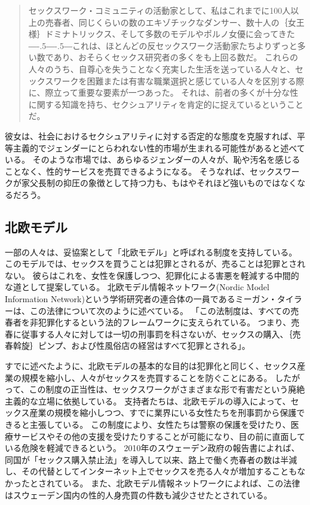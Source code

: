 \documentclass[paper=a4,book,openany]{jlreq}
\def\DDASH{―\kern-.5\zw―\kern-.5\zw―} %
\begin{document}
\begin{quote}
セックスワーク・コミュニティの活動家として、私はこれまでに100人以上の売春者、同じくらいの数のエキゾチックなダンサー、数十人の｛女王様｝{ドミナトリックス}、そして多数のモデルやポルノ女優に会ってきた{\DDASH}これは、ほとんどの反セックスワーク活動家たちよりずっと多い数であり、おそらくセックス研究者の多くをも上回る数だ。
これらの人々のうち、自尊心を失うことなく充実した生活を送っている人々と、セックスワークを困難または有害な職業選択と感じている人々を区別する際に、際立って重要な要素が一つあった。
それは、前者の多くが十分な性に関する知識を持ち、セクシュアリティを肯定的に捉えているということだ。
\citep[pp.128--129]{queen97:_sex_radic_polit_sex_posit}
\end{quote}

彼女は、社会におけるセクシュアリティに対する否定的な態度を克服すれば、平等主義的でジェンダーにとらわれない性的市場が生まれる可能性があると述べている。
そのような市場では、あらゆるジェンダーの人々が、恥や汚名を感じることなく、性的サービスを売買できるようになる。
そうなれば、セックスワークが家父長制の抑圧の象徴として持つ力も、もはやそれほど強いものではなくなるだろう。

\subsection{北欧モデル}

一部の人々は、妥協案として「北欧モデル」と呼ばれる制度を支持している。
このモデルでは、セックスを買うことは犯罪とされるが、売ることは犯罪とされない。
彼らはこれを、女性を保護しつつ、犯罪化による害悪を軽減する中間的な道として提案している。
北欧モデル情報ネットワーク(Nordic Model Information Network)という学術研究者の連合体の一員であるミーガン・タイラーは、この法律について次のように述べている。
「この法制度は、すべての売春者を非犯罪化するという法的フレームワークに支えられている。
つまり、売春に従事する人々に対しては一切の刑事罰を科さないが、セックスの購入、｛売春斡旋｝{ピンプ}、および性風俗店の経営はすべて犯罪とされる」\citep{woodward16:_calls_austr_adopt_nordic_model_prost}。

すでに述べたように、北欧モデルの基本的な目的は犯罪化と同じく、セックス産業の規模を縮小し、人々がセックスを売買することを防ぐことにある。
したがって、この制度の正当性は、セックスワークがさまざまな形で有害だという廃絶主義的な立場に依拠している。
支持者たちは、北欧モデルの導入によって、セックス産業の規模を縮小しつつ、すでに業界にいる女性たちを刑事罰から保護できると主張している。
この制度により、女性たちは警察の保護を受けたり、医療サービスやその他の支援を受けたりすることが可能になり、目の前に直面している危険を軽減できるという。
2010年のスウェーデン政府の報告書によれば、同国が「セックス購入禁止法」を導入して以来、路上で働く売春者の数は半減し、その代替としてインターネット上でセックスを売る人々が増加することもなかったとされている\citep{sweden10:_repor_sou}。
また、北欧モデル情報ネットワークによれば、この法律はスウェーデン国内の性的人身売買の件数も減少させたとされている\citep[p.25]{commons16:_prost}。
\end{document}
